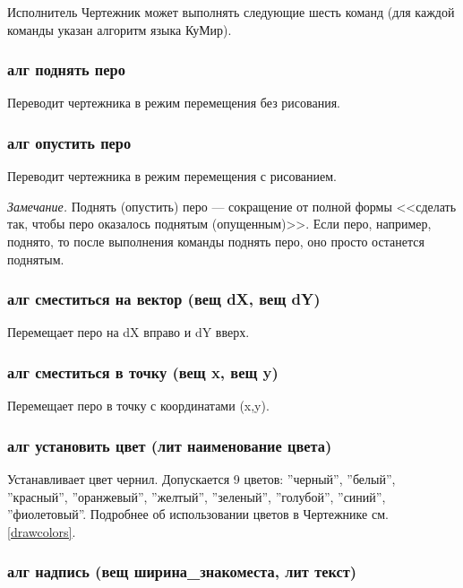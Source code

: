 \documentclass[12pt,a4paper]{article}
\begin{document}
Исполнитель Чертежник может выполнять следующие шесть команд (для каждой команды указан алгоритм языка КуМир).

\subsubsection{\textbf{алг} поднять перо}

Переводит чертежника в режим перемещения без рисования.

\subsubsection{\textbf{алг} опустить перо}

Переводит чертежника в режим перемещения с рисованием.

\emph{Замечание.} Поднять (опустить) перо --- сокращение от полной формы <<сделать так, чтобы перо оказалось поднятым (опущенным)>>. Если перо, например, поднято, то после выполнения команды \textsf{поднять перо}, оно просто останется поднятым.

\subsubsection{\textbf{алг} сместиться на вектор (\textbf{вещ} dX, \textbf{вещ} dY)}

Перемещает перо на dX вправо и dY вверх.

\subsubsection{\textbf{алг} сместиться в точку (\textbf{вещ} x, \textbf{вещ} y)}

Перемещает перо в точку с координатами (x,y).

\subsubsection{\textbf{алг} установить цвет (\textbf{лит} наименование цвета)}
\label{drawsetcolor}

Устанавливает цвет чернил. Допускается 9 цветов: ''черный'', ''белый'', ''красный'', \mbox{''оранжевый''}, ''желтый'', ''зеленый'', ''голубой'', ''синий'', ''фиолетовый''. Подробнее об использовании цветов в Чертежнике см. \ref{drawcolors}.

\subsubsection{\textbf{алг} надпись (\textbf{вещ} ширина\_знакоместа, \textbf{лит} текст)}
\end{document}
